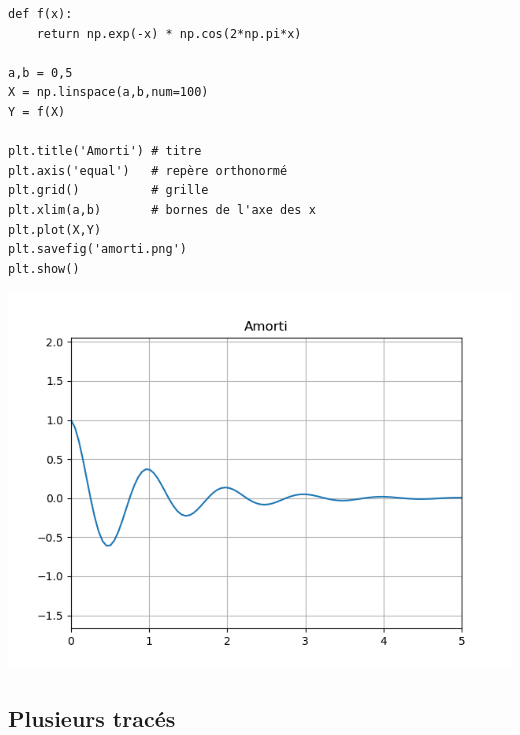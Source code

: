 \documentclass[11pt,class=report,crop=false]{standalone}
\begin{document}
\begin{minipage}{0.55\textwidth}
\begin{lstlisting}
def f(x):
	return np.exp(-x) * np.cos(2*np.pi*x)

a,b = 0,5
X = np.linspace(a,b,num=100)
Y = f(X)

plt.title('Amorti') # titre
plt.axis('equal')   # repère orthonormé
plt.grid()          # grille 
plt.xlim(a,b)       # bornes de l'axe des x
plt.plot(X,Y)
plt.savefig('amorti.png')
plt.show()
\end{lstlisting}
\end{minipage}
\begin{minipage}{0.39\textwidth}
\begin{center}
\includegraphics[scale=\myscale,scale=0.45]{figures/pythonx-amorti}
\end{center}
\end{minipage}

\subsection{Plusieurs tracés}
\end{document}
